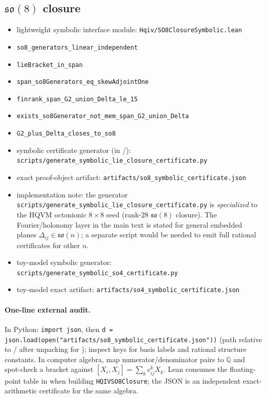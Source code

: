 \documentclass[11pt]{amsart}
\newcommand{\PaperArtifactBundleZip}{\ReleaseDistArchive}
\newcommand{\PaperArtifactBundleDir}{\PaperReproBundleDir}
\begin{document}
\subsection*{\texorpdfstring{$\mathfrak{so}(8)$}{so(8)} closure}
\begin{itemize}
\item lightweight symbolic interface module:
\texttt{Hqiv/SO8ClosureSymbolic.lean}
\item \texttt{so8\_generators\_linear\_independent}
\item \texttt{lieBracket\_in\_span}
\item \texttt{span\_so8Generators\_eq\_skewAdjointOne}
\item \texttt{finrank\_span\_G2\_union\_Delta\_le\_15}
\item \texttt{exists\_so8Generator\_not\_mem\_span\_G2\_union\_Delta}
\item \texttt{G2\_plus\_Delta\_closes\_to\_so8}
\item symbolic certificate generator (in \PaperArtifactBundleDir/):
\texttt{scripts/generate\_symbolic\_lie\_closure\_certificate.py}
\item exact proof-object artifact:
\texttt{artifacts/so8\_symbolic\_certificate.json}
\item implementation note: the generator \texttt{scripts/generate\_symbolic\_lie\_closure\_certificate.py} is \emph{specialized} to the HQVM octonionic \(8\times8\) seed (rank-\(28\) \(\mathfrak{so}(8)\) closure). The Fourier/holonomy layer in the main text is stated for general embedded planes \(\Delta_{ij}\in\mathfrak{so}(n)\); a separate script would be needed to emit full rational certificates for other \(n\).
\item toy-model symbolic generator:
\texttt{scripts/generate\_symbolic\_so4\_certificate.py}
\item toy-model exact artifact:
\texttt{artifacts/so4\_symbolic\_certificate.json}
\end{itemize}

\paragraph{One-line external audit.}
In Python: \texttt{import json}, then \texttt{d = json.load(open("artifacts/so8\_symbolic\_certificate.json"))} (path relative to \PaperArtifactBundleDir/ after unpacking \PaperArtifactBundleZip{} for ); inspect keys for basis labels and rational structure constants. In computer algebra, map numerator/denominator pairs to \(\mathbb Q\) and spot-check a bracket against \([X_i,X_j]=\sum_k c^k_{ij}X_k\). Lean consumes the floating-point table in  when building \texttt{HQIVSO8Closure}; the JSON is an independent exact-arithmetic certificate for the same algebra.
\end{document}
